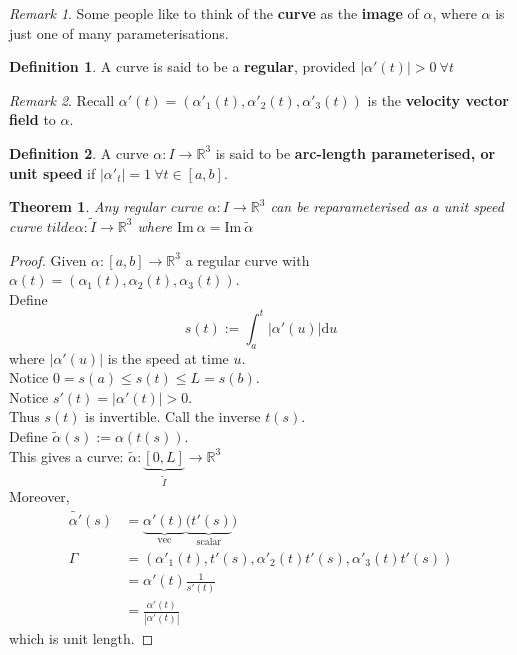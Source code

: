 \documentclass{article}
\renewcommand{\d}{\mathrm{d}}
\newcommand{\R}{\mathbb{R}}
\newcommand{\im}{\mathrm{Im}\ }
\newtheorem{theorem}{Theorem}[section]
\theoremstyle{definition}
\newtheorem{definition}{Definition}[section]
\theoremstyle{remark}
\theoremstyle{example}
\newtheorem*{remark}{Remark}
\begin{document}
	\begin{remark}
		Some people like to think of the \textbf{curve} as the \textbf{image} of $\alpha$, where $\alpha$ is just one of many parameterisations.
	\end{remark}

	\begin{definition}
		A curve is said to be a \textbf{regular}, provided $|\alpha'(t)|>0\  \forall t$
	\end{definition}

	\begin{remark}
		Recall $\alpha'(t)=(\alpha'_1(t),\alpha'_2(t), \alpha'_3(t))$ is the \textbf{velocity vector field} to $\alpha$.
	\end{remark}

	\begin{definition}
		A curve $\alpha : I \to \R^3$ is said to be \textbf{arc-length parameterised, or unit speed} if $|\alpha'_t|=1\ \forall t \in [a,b]$.
	\end{definition}

	\begin{theorem}
		Any regular curve $\alpha : I \to \R^3$ can be reparameterised as a unit speed curve $tilde{\alpha}:\tilde{I} \to \R^3$ where $\im \alpha = \im \tilde{\alpha}$
	\end{theorem}

	\begin{proof}
		Given $\alpha : [a,b] \to \R^3$ a regular curve with $\alpha(t)=(\alpha_1(t),\alpha_2(t),\alpha_3(t))$.\\
		Define \[s(t) := \int_{a}^{t}|\alpha'(u) |\d u \]
		where $|\alpha'(u)|$ is the speed at time $u$.\\
		Notice $0=s(a) \leq s(t) \leq L=s(b)$.\\
		Notice $s'(t)=|\alpha'(t)| > 0$.\\
		Thus $s(t)$ is invertible. Call the inverse $t(s)$.\\
		Define $\tilde{\alpha}(s):=\alpha(t(s))$.\\
		This gives a curve: $\tilde{\alpha}:\underbrace{[0,L]}_{\tilde{I}} \to \R^3$\\
		Moreover,
		\begin{align*}
			\tilde{\alpha'}(s) & =\underbrace{\alpha'(t)}_\mathrm{vec}\underbrace{(t'(s)}_\mathrm{scalar})\\
			\Gamma & = (\alpha'_1(t),t'(s),\alpha'_2(t)t'(s),\alpha'_3(t)t'(s))\\
			& = \alpha'(t)\frac{1}{s'(t)}\\
			& = \frac{\alpha'(t)}{|\alpha'(t)|}
		\end{align*}
		which is unit length.
	\end{proof}
\end{document}
